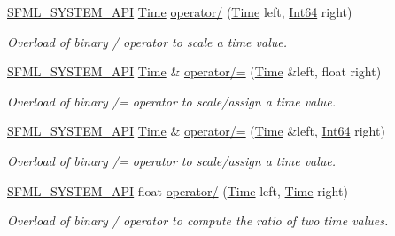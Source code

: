 \begin{DoxyCompactItemize}
\hyperlink{sfml_2dep_2_s_f_m_l-2_84_82_2include_2_s_f_m_l_2_system_2_export_8hpp_a6476c9e422606477a4c23d92b1d79a1f}{S\-F\-M\-L\-\_\-\-S\-Y\-S\-T\-E\-M\-\_\-\-A\-P\-I} \hyperlink{classsf_1_1_time}{Time} \hyperlink{classsf_1_1_time_ab72f2de3e2bb592b4b4008dc1ac79056}{operator/} (\hyperlink{classsf_1_1_time}{Time} left, \hyperlink{namespacesf_a2840579fed3494d9f330baf7a5a19903}{Int64} right)
\begin{DoxyCompactList}\small\item\em Overload of binary / operator to scale a time value. \end{DoxyCompactList}\item 
\hyperlink{sfml_2dep_2_s_f_m_l-2_84_82_2include_2_s_f_m_l_2_system_2_export_8hpp_a6476c9e422606477a4c23d92b1d79a1f}{S\-F\-M\-L\-\_\-\-S\-Y\-S\-T\-E\-M\-\_\-\-A\-P\-I} \hyperlink{classsf_1_1_time}{Time} \& \hyperlink{classsf_1_1_time_a9835490c54cab06492ec3aa9e9275ef9}{operator/=} (\hyperlink{classsf_1_1_time}{Time} \&left, float right)
\begin{DoxyCompactList}\small\item\em Overload of binary /= operator to scale/assign a time value. \end{DoxyCompactList}\item 
\hyperlink{sfml_2dep_2_s_f_m_l-2_84_82_2include_2_s_f_m_l_2_system_2_export_8hpp_a6476c9e422606477a4c23d92b1d79a1f}{S\-F\-M\-L\-\_\-\-S\-Y\-S\-T\-E\-M\-\_\-\-A\-P\-I} \hyperlink{classsf_1_1_time}{Time} \& \hyperlink{classsf_1_1_time_ad51871e3db77def834ae8688e64504ff}{operator/=} (\hyperlink{classsf_1_1_time}{Time} \&left, \hyperlink{namespacesf_a2840579fed3494d9f330baf7a5a19903}{Int64} right)
\begin{DoxyCompactList}\small\item\em Overload of binary /= operator to scale/assign a time value. \end{DoxyCompactList}\item 
\hyperlink{sfml_2dep_2_s_f_m_l-2_84_82_2include_2_s_f_m_l_2_system_2_export_8hpp_a6476c9e422606477a4c23d92b1d79a1f}{S\-F\-M\-L\-\_\-\-S\-Y\-S\-T\-E\-M\-\_\-\-A\-P\-I} float \hyperlink{classsf_1_1_time_ac3ae4f4d24a93e088d8e36d68322ea0f}{operator/} (\hyperlink{classsf_1_1_time}{Time} left, \hyperlink{classsf_1_1_time}{Time} right)
\begin{DoxyCompactList}\small\item\em Overload of binary / operator to compute the ratio of two time values. \end{DoxyCompactList}\item 

\end{DoxyCompactItemize}
